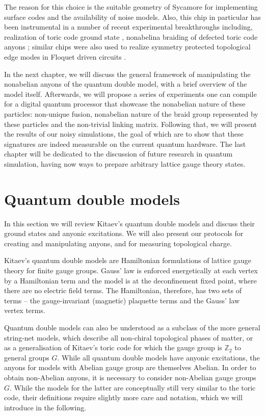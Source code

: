 \documentclass[two column]{article}
\begin{document}
The reason for this choice is the suitable geometry of Sycamore for implementing surface codes and the availability of noise models. Also, this chip in particular has been instrumental in a number of recent experimental breakthroughs including, realization of toric code ground state \cite{}, nonabelina braiding of defected toric code anyons \cite{}; similar chips were also used to realize symmetry protected topological edge modes in Floquet driven circuits \cite{}.

In the next chapter, we will discuss the general framework of manipulating the nonabelian anyons of the quantum double model, with a brief overview of the model itself. Afterwards, we will propose a series of experiments one can compile for a digital quantum processor that showcase the nonabelian nature of these particles: non-unique fusion, nonabelian nature of the braid group represented by these particles and the non-trivial linking matrix. Following that, we will present the results of our noisy simulations, the goal of which are to show that these signatures are indeed measurable on the current quantum hardware. The last chapter will be dedicated to the discussion of future research in quantum simulation, having now ways to prepare arbitrary lattice gauge theory states.

\section{Quantum double models}

In this section we will review Kitaev's quantum double models\cite{Kitaev_2003} and discuss their ground states and anyonic excitations. We will also present our protocols for creating and manipulating anyons, and for measuring topological charge. 

Kitaev's quantum double models are Hamiltonian formulations of lattice gauge theory for finite gauge groups. Gauss' law is enforced energetically at each vertex by a Hamiltonian term and the model is at the deconfinement fixed point, where there are no electric field terms.
The Hamiltonian, therefore, has two sets of terms -- the gauge-invariant (magnetic) plaquette terms and the Gauss' law vertex terms\cite{cui2018topological, Kitaev_2003}. 

Quantum double models can also be understood as a subclass of the more general string-net models\cite{Levin_2005}, which describe all non-chiral topological phases of matter, or as a generalisation of Kitaev's toric code\cite{Kitaev_2003} for which the gauge group is $\mathbb Z_2$ to general groups $G$. While all quantum double models have anyonic excitations, the anyons for models with Abelian gauge group are themselves Abelian. In order to obtain non-Abelian anyons, it is necessary to consider non-Abelian gauge groups $G$. While the models for the latter are conceptually still very similar to the toric code, their definitions require slightly more care and notation, which we will introduce in the following. 
\end{document}
